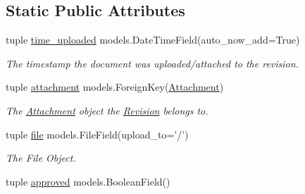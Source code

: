 \subsection*{Static Public Attributes}
\begin{DoxyCompactItemize}
\item 
\hypertarget{class_learn_1_1models_1_1_revision_ab99a5799125da47290ffeca85fb4d290}{tuple \hyperlink{class_learn_1_1models_1_1_revision_ab99a5799125da47290ffeca85fb4d290}{time\-\_\-uploaded} models.\-Date\-Time\-Field(auto\-\_\-now\-\_\-add=True)}\label{class_learn_1_1models_1_1_revision_ab99a5799125da47290ffeca85fb4d290}

\begin{DoxyCompactList}\small\item\em The timestamp the document was uploaded/attached to the revision. \end{DoxyCompactList}\item 
tuple \hyperlink{class_learn_1_1models_1_1_revision_a1e0c1e0fafeb906c3ed10e882571f9e2}{attachment} models.\-Foreign\-Key(\hyperlink{class_learn_1_1models_1_1_attachment}{Attachment})
\begin{DoxyCompactList}\small\item\em The \hyperlink{class_learn_1_1models_1_1_attachment}{Attachment} object the \hyperlink{class_learn_1_1models_1_1_revision}{Revision} belongs to. \end{DoxyCompactList}\item 
\hypertarget{class_learn_1_1models_1_1_revision_ab6a44857b140b43e3dd0345a7bd94284}{tuple \hyperlink{class_learn_1_1models_1_1_revision_ab6a44857b140b43e3dd0345a7bd94284}{file} models.\-File\-Field(upload\-\_\-to='/')}\label{class_learn_1_1models_1_1_revision_ab6a44857b140b43e3dd0345a7bd94284}

\begin{DoxyCompactList}\small\item\em The File Object. \end{DoxyCompactList}\item 
\hypertarget{class_learn_1_1models_1_1_revision_a6bb6313e61fc4d6199b11c67ce6ea781}{tuple \hyperlink{class_learn_1_1models_1_1_revision_a6bb6313e61fc4d6199b11c67ce6ea781}{approved} models.\-Boolean\-Field()}\label{class_learn_1_1models_1_1_revision_a6bb6313e61fc4d6199b11c67ce6ea781}


\end{DoxyCompactItemize}
